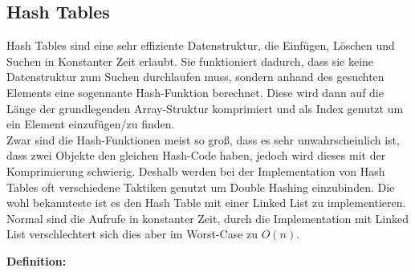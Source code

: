 \documentclass[
../AuD-Zusammenfassung.tex,
]
{subfiles}
\begin{document}
\subsection{Hash Tables}
Hash Tables sind eine sehr effiziente Datenstruktur, die Einfügen, Löschen und Suchen in Konstanter Zeit erlaubt. Sie funktioniert dadurch, dass sie keine Datenstruktur zum Suchen durchlaufen muss, sondern anhand des gesuchten Elements eine sogennante Hash-Funktion berechnet. Diese wird dann auf die Länge der grundlegenden Array-Struktur komprimiert und als Index genutzt um ein Element einzufügen/zu finden. \\
Zwar sind die Hash-Funktionen meist so groß, dass es sehr unwahrscheinlich ist, dass zwei Objekte den gleichen Hash-Code haben, jedoch wird dieses mit der Komprimierung schwierig. Deshalb werden bei der Implementation von Hash Tables oft verschiedene Taktiken genutzt um Double Hashing einzubinden. Die wohl bekannteste ist es den Hash Table mit einer Linked List zu implementieren. \\
Normal sind die Aufrufe in konstanter Zeit, durch die Implementation mit Linked List verschlechtert sich dies aber im Worst-Case zu $O(n)$.

\textbf{Definition:}

\begin{algorithm}[H]
\end{algorithm}
\end{document}
